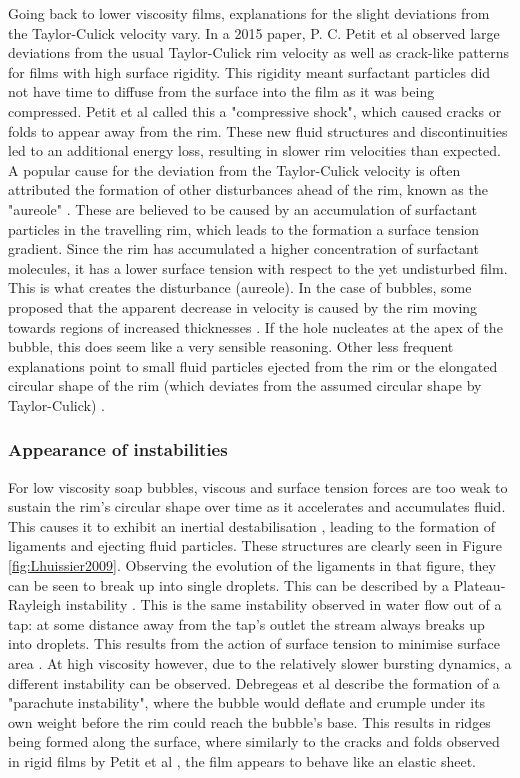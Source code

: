 \documentclass[a4paper,12pt]{article}
\numberwithin{equation}{section}
\numberwithin{figure}{section}
\numberwithin{table}{section}
\begin{document}
Going back to lower viscosity films, explanations for the slight deviations from the Taylor-Culick velocity vary. In a 2015 paper, P. C. Petit et al \cite{Petit2015} observed large deviations from the usual Taylor-Culick rim velocity as well as crack-like patterns for films with high surface rigidity. This rigidity meant surfactant particles did not have time to diffuse from the surface into the film as it was being compressed. Petit et al called this a "compressive shock", which caused cracks or folds to appear away from the rim. These new fluid structures and discontinuities led to an additional energy loss, resulting in slower rim velocities than expected. A popular cause for the deviation from the Taylor-Culick velocity is often attributed the formation of other disturbances ahead of the rim, known as the "aureole" \cite{McEntee1969, Bico2015, Muller2009}. These are believed to be caused by an accumulation of surfactant particles in the travelling rim, which leads to the formation a surface tension gradient. Since the rim has accumulated a higher concentration of surfactant molecules, it has a lower surface tension with respect to the yet undisturbed film. This is what creates the disturbance (aureole). In the case of bubbles, some proposed that the apparent decrease in velocity is caused by the rim moving towards regions of increased thicknesses \cite{Mukerjee1971, Debregeas1998}. If the hole nucleates at the apex of the bubble, this does seem like a very sensible reasoning. Other less frequent explanations point to small fluid particles ejected from the rim \cite{Muller2009} or the elongated circular shape of the rim (which deviates from the assumed circular shape by Taylor-Culick) \cite{Bico2015}.

\subsubsection{Appearance of instabilities}
For low viscosity soap bubbles, viscous and surface tension forces are too weak to sustain the rim's circular shape over time as it accelerates and accumulates fluid. This causes it to exhibit an inertial destabilisation \cite{Lhuissier2011}, leading to the formation of ligaments and ejecting fluid particles. These structures are clearly seen in Figure \ref{fig:Lhuissier2009}. Observing the evolution of the ligaments in that figure, they can be seen to break up into single droplets. This can be described by a Plateau-Rayleigh instability \cite{Lhuissier2011}. This is the same instability observed in water flow out of a tap: at some distance away from the tap's outlet the stream always breaks up into droplets. This results from the action of surface tension to minimise surface area \cite{Rayleigh1878}. At high viscosity however, due to the relatively slower bursting dynamics, a different instability can be observed. Debregeas et al \cite{Debregeas1998} describe the formation of a "parachute instability", where the bubble would deflate and crumple under its own weight before the rim could reach the bubble's base. This results in ridges being formed along the surface, where similarly to the cracks and folds observed in rigid films by Petit et al \cite{Petit2015}, the film appears to behave like an elastic sheet.
\end{document}
